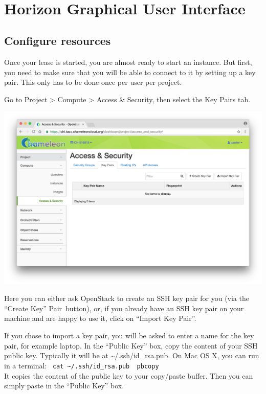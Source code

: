\FILENAME\

\section{Horizon Graphical User Interface}
\label{C:cc-horizon}

\subsection{Configure resources}

Once your lease is started, you are almost ready to start an instance.
But first, you need to make sure that you will be able to connect to
it by setting up a key pair. This only has to be done once per user
per project.

Go to Project \textgreater{} Compute \textgreater{} Access \& Security,
then select the Key Pairs tab.

\includegraphics[width=0.8\columnwidth]{images/chameleon/Screen-Shot-2016-10-26-at-14-37-00.png}

Here you can either ask OpenStack to create an SSH key pair for you (via
the ``Create Key'' Pair~button), or, if you already have an SSH key pair
on your machine and are happy to use it, click on ``Import Key Pair''.

If you chose to import a key pair, you will be asked to enter a name for
the key pair, for example laptop. In the ``Public Key'' box, copy the
content of your SSH public key. Typically it will be at
\textasciitilde{}/.ssh/id\_rsa.pub. On Mac OS X, you can run in a
terminal:
~\texttt{cat\ \textasciitilde{}/.ssh/id\_rsa.pub\ \textbar{}\ pbcopy}\\
It copies the content of the public key to your copy/paste buffer. Then
you can simply paste in the ``Public Key'' box.

